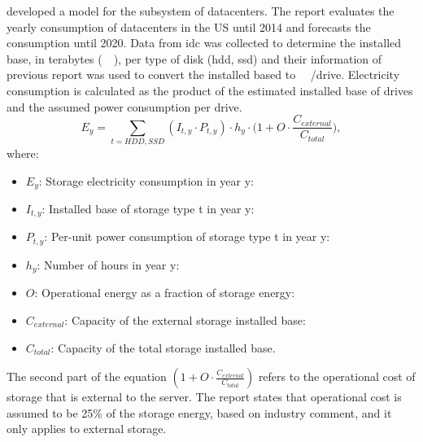 
\citet{Shehabi2016} developed a model for the subsystem of datacenters. The report evaluates the yearly consumption of datacenters in the US until 2014 and forecasts the consumption until 2020. Data from \ac{idc} was collected to determine the installed base, in terabytes (\SI{}{\tera\byte}), per type of disk (\ac{hdd}, \ac{ssd}) and their information of previous report \citet{Incorporated2007} was used to convert the installed based to \SI{}{\tera\byte}/drive.
Electricity consumption is calculated as the product of the estimated installed base of drives and the assumed power consumption per drive.
%
\begin{equation}
\label{formula:usreport2016}
    E_y = \sum_{t=HDD,SSD}{(I_{t,y} \cdot P_{t,y}) \cdot h_y \cdot \bigg(1 + O \cdot \frac{C_{external}}{C_{total}}\bigg)},
\end{equation}
%
where:
\begin{itemize}
    \item $E_y$: Storage electricity consumption in year y:
    \item $I_{t,y}$: Installed base of storage type t in year y:
    \item $P_{t,y}$: Per-unit power consumption of storage type t in year y:
    \item $h_y$: Number of hours in year y:
    \item $O$: Operational energy as a fraction of storage energy:
    \item $C_{external}$: Capacity of the external storage installed base:
    \item $C_{total}$: Capacity of the total storage installed base.
\end{itemize}

The second part of the equation $(1 + O \cdot \frac{C_{external}}{C_{total}})$ refers to the operational cost of storage that is external to the server.
The report states that operational cost is assumed to be 25\% of the storage energy, based on industry comment, and it only applies to external storage.


